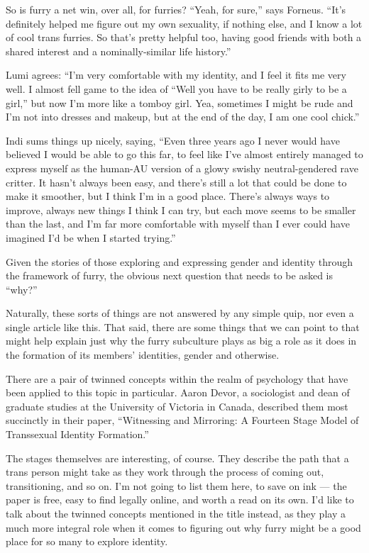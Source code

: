 So is furry a net win, over all, for furries? ``Yeah, for sure,'' says Forneus.  ``It’s definitely helped me figure out my own sexuality, if nothing else, and I know a lot of cool trans furries.  So that’s pretty helpful too, having good friends with both a shared interest and a nominally-similar life history.''

Lumi agrees: ``I’m very comfortable with my identity, and I feel it fits me very well. I almost fell game to the idea of ``Well you have to be really girly to be a girl,'' but now I’m more like a tomboy girl. Yea, sometimes I might be rude and I’m not into dresses and makeup, but at the end of the day, I am one cool chick.''

Indi sums things up nicely, saying, ``Even three years ago I never would have believed I would be able to go this far, to feel like I've almost entirely managed to express myself as the human-AU version of a glowy swishy neutral-gendered rave critter.  It hasn't always been easy, and there's still a lot that could be done to make it smoother, but I think I'm in a good place. There's always ways to improve, always new things I think I can try, but each move seems to be smaller than the last, and I'm far more comfortable with myself than I ever could have imagined I'd be when I started trying.''

\secdiv

Given the stories of those exploring and expressing gender and identity through the framework of furry, the obvious next question that needs to be asked is ``why?''

Naturally, these sorts of things are not answered by any simple quip, nor even a single article like this.  That said, there are some things that we can point to that might help explain just why the furry subculture plays as big a role as it does in the formation of its members' identities, gender and otherwise.

There are a pair of twinned concepts within the realm of psychology that have been applied to this topic in particular.  Aaron Devor, a sociologist and dean of graduate studies at the University of Victoria in Canada, described them most succinctly in their paper, ``Witnessing and Mirroring: A Fourteen Stage Model of Transsexual Identity Formation.''

The stages themselves are interesting, of course.  They describe the path that a trans person might take as they work through the process of coming out, transitioning, and so on.  I'm not going to list them here, to save on ink --- the paper is free, easy to find legally online, and worth a read on its own.  I'd like to talk about the twinned concepts mentioned in the title instead, as they play a much more integral role when it comes to figuring out why furry might be a good place for so many to explore identity.

